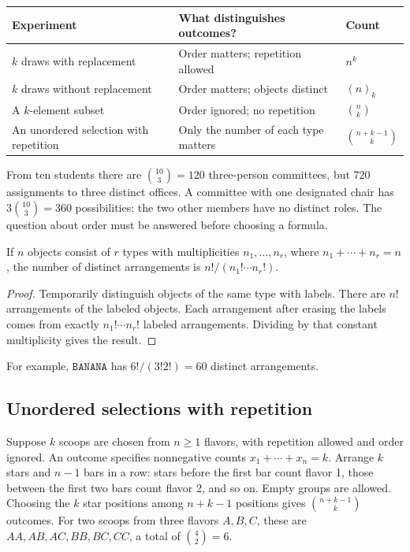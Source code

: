 \begin{center}
\small
\begin{tabularx}{\textwidth}{@{}XXl@{}}
\toprule
Experiment & What distinguishes outcomes? & Count \\
\midrule
$k$ draws with replacement & Order matters; repetition allowed & $n^k$ \\
$k$ draws without replacement & Order matters; objects distinct & $(n)_k$ \\
A $k$-element subset & Order ignored; no repetition & $\binom nk$ \\
An unordered selection with repetition & Only the number of each type matters & $\binom{n+k-1}{k}$ \\
\bottomrule
\end{tabularx}
\end{center}

\begin{example}
From ten students there are $\binom{10}{3}=120$ three-person committees,
but $720$ assignments to three distinct offices. A committee with one
designated chair has $3\binom{10}{3}=360$ possibilities: the two other
members have no distinct roles. The question about order must be answered
before choosing a formula.
\end{example}

\begin{proposition}
If $n$ objects consist of $r$ types with multiplicities
$n_1,\ldots,n_r$, where $n_1+\cdots+n_r=n$, the number of distinct
arrangements is $n!/(n_1!\cdots n_r!)$.
\end{proposition}
\begin{proof}
Temporarily distinguish objects of the same type with labels. There are
$n!$ arrangements of the labeled objects. Each arrangement after erasing
the labels comes from exactly $n_1!\cdots n_r!$ labeled arrangements.
Dividing by that constant multiplicity gives the result.
\end{proof}
For example, $\texttt{BANANA}$ has $6!/(3!2!)=60$ distinct arrangements.

\subsection*{Unordered selections with repetition}
Suppose $k$ scoops are chosen from $n\ge1$ flavors, with repetition allowed
and order ignored. An outcome specifies nonnegative counts
$x_1+\cdots+x_n=k$. Arrange $k$ stars and $n-1$ bars in a row: stars
before the first bar count flavor 1, those between the first two bars
count flavor 2, and so on. Empty groups are allowed. Choosing the $k$
star positions among $n+k-1$ positions gives $\binom{n+k-1}{k}$ outcomes.
For two scoops from three flavors $A,B,C$, these are
$AA,AB,AC,BB,BC,CC$, a total of $\binom42=6$.

